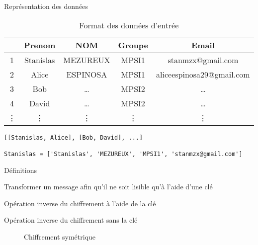 \documentclass[10pt, compress]{beamer}
\begin{document}
  \begin{frame}[fragile]{Représentation des données}
    \begin{table}
      \caption{Format des données d'entrée}
      \begin{tabular}{ccccc}
          \hline
          & Prenom & NOM & Groupe & Email\\
          \hline
          1 & Stanislas & MEZUREUX & MPSI1 & stanmzx@gmail.com \\
          2 & Alice & ESPINOSA & MPSI1 & aliceespinosa29@gmail.com \\
          3 & Bob & \ldots & MPSI2 & \ldots \\
          4 & David & \ldots & MPSI2 & \ldots \\
          \vdots & \vdots & \vdots & \vdots & \vdots \\
          \hline
      \end{tabular}
    \end{table}
    \pause
    \begin{longlisting}
      \caption{Format des données manipulées}
      \begin{verbatim}
[[Stanislas, Alice], [Bob, David], ...]

Stanislas = ['Stanislas', 'MEZUREUX', 'MPSI1', 'stanmzx@gmail.com']
      \end{verbatim}
    \end{longlisting}
  \end{frame}

  \begin{frame}{Définitions}
    \begin{description}[<+->]
      \item[Chiffrer (C)] Transformer un message afin qu'il ne soit lisible qu'à l'aide d'une clé
      \item[Déchiffrer (D)] Opération inverse du chiffrement à l'aide de la clé
      \item[Décrypter (A)] Opération inverse du chiffrement sans la clé
    \end{description}
    \bigbreak
    \begin{figure}
      \caption{Chiffrement symétrique}
    \end{figure}
  \end{frame}
\end{document}
